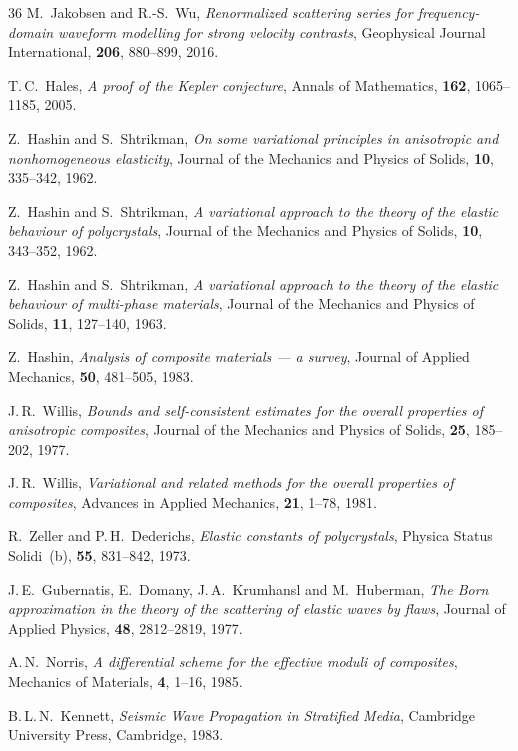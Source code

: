 \begin{thebibliography}{36}
M.~Jakobsen and R.-S.~Wu,
\textit{Renormalized scattering series for frequency-domain waveform modelling
for strong velocity contrasts},
Geophysical Journal International, \textbf{206}, 880--899, 2016.

T.\,C.~Hales,
\textit{A proof of the Kepler conjecture},
Annals of Mathematics, \textbf{162}, 1065--1185, 2005.

Z.~Hashin and S.~Shtrikman,
\textit{On some variational principles in anisotropic and nonhomogeneous
elasticity},
Journal of the Mechanics and Physics of Solids, \textbf{10}, 335--342, 1962.

Z.~Hashin and S.~Shtrikman,
\textit{A variational approach to the theory of the elastic behaviour of
polycrystals},
Journal of the Mechanics and Physics of Solids, \textbf{10}, 343--352, 1962.

Z.~Hashin and S.~Shtrikman,
\textit{A variational approach to the theory of the elastic behaviour of
multi-phase materials},
Journal of the Mechanics and Physics of Solids, \textbf{11}, 127--140, 1963.

Z.~Hashin,
\textit{Analysis of composite materials --- a survey},
Journal of Applied Mechanics, \textbf{50}, 481--505, 1983.

J.\,R.~Willis,
\textit{Bounds and self-consistent estimates for the overall properties of
anisotropic composites},
Journal of the Mechanics and Physics of Solids, \textbf{25}, 185--202, 1977.

J.\,R.~Willis,
\textit{Variational and related methods for the overall properties of
composites},
Advances in Applied Mechanics, \textbf{21}, 1--78, 1981.

R.~Zeller and P.\,H.~Dederichs,
\textit{Elastic constants of polycrystals},
Physica Status Solidi~(b), \textbf{55}, 831--842, 1973.

J.\,E.~Gubernatis, E.~Domany, J.\,A.~Krumhansl and M.~Huberman,
\textit{The Born approximation in the theory of the scattering of elastic
waves by flaws},
Journal of Applied Physics, \textbf{48}, 2812--2819, 1977.

A.\,N.~Norris,
\textit{A differential scheme for the effective moduli of composites},
Mechanics of Materials, \textbf{4}, 1--16, 1985.

B.\,L.\,N.~Kennett,
\textit{Seismic Wave Propagation in Stratified Media},
Cambridge University Press, Cambridge, 1983.


\end{thebibliography}
